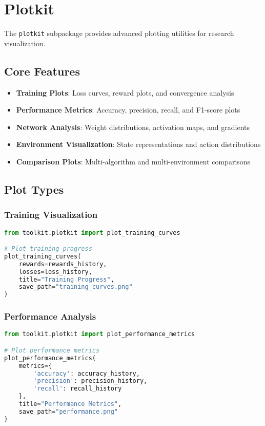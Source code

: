 \section{Plotkit}

The \texttt{plotkit} subpackage provides advanced plotting utilities for research visualization.

\subsection{Core Features}

\begin{itemize}
    \item \textbf{Training Plots}: Loss curves, reward plots, and convergence analysis
    \item \textbf{Performance Metrics}: Accuracy, precision, recall, and F1-score plots
    \item \textbf{Network Analysis}: Weight distributions, activation maps, and gradients
    \item \textbf{Environment Visualization}: State representations and action distributions
    \item \textbf{Comparison Plots}: Multi-algorithm and multi-environment comparisons
\end{itemize}

\subsection{Plot Types}

\subsubsection{Training Visualization}

\begin{lstlisting}[language=python, caption=Training plot example]
from toolkit.plotkit import plot_training_curves

# Plot training progress
plot_training_curves(
    rewards=rewards_history,
    losses=loss_history,
    title="Training Progress",
    save_path="training_curves.png"
)
\end{lstlisting}

\subsubsection{Performance Analysis}

\begin{lstlisting}[language=python, caption=Performance analysis example]
from toolkit.plotkit import plot_performance_metrics

# Plot performance metrics
plot_performance_metrics(
    metrics={
        'accuracy': accuracy_history,
        'precision': precision_history,
        'recall': recall_history
    },
    title="Performance Metrics",
    save_path="performance.png"
)
\end{lstlisting}

